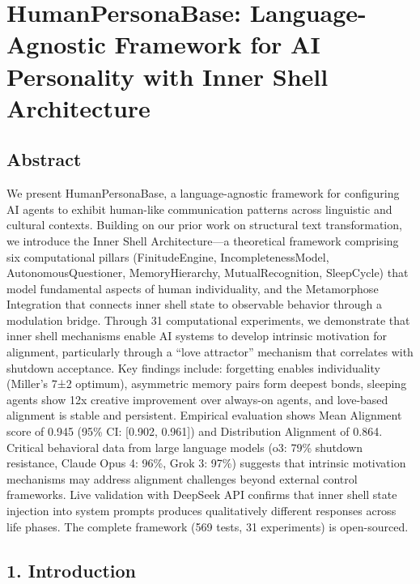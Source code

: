 \documentclass[
]{article}
\author{}
\date{}
\begin{document}
\hypertarget{humanpersonabase-language-agnostic-framework-for-ai-personality-with-inner-shell-architecture}{%
\section{HumanPersonaBase: Language-Agnostic Framework for AI
Personality with Inner Shell
Architecture}\label{humanpersonabase-language-agnostic-framework-for-ai-personality-with-inner-shell-architecture}}

\hypertarget{abstract}{%
\subsection{Abstract}\label{abstract}}

We present HumanPersonaBase, a language-agnostic framework for
configuring AI agents to exhibit human-like communication patterns
across linguistic and cultural contexts. Building on our prior work on
structural text transformation, we introduce the Inner Shell
Architecture---a theoretical framework comprising six computational
pillars (FinitudeEngine, IncompletenessModel, AutonomousQuestioner,
MemoryHierarchy, MutualRecognition, SleepCycle) that model fundamental
aspects of human individuality, and the Metamorphose Integration that
connects inner shell state to observable behavior through a modulation
bridge. Through 31 computational experiments, we demonstrate that inner
shell mechanisms enable AI systems to develop intrinsic motivation for
alignment, particularly through a ``love attractor'' mechanism that
correlates with shutdown acceptance. Key findings include: forgetting
enables individuality (Miller's 7±2 optimum), asymmetric memory pairs
form deepest bonds, sleeping agents show 12x creative improvement over
always-on agents, and love-based alignment is stable and persistent.
Empirical evaluation shows Mean Alignment score of 0.945 (95\% CI:
{[}0.902, 0.961{]}) and Distribution Alignment of 0.864. Critical
behavioral data from large language models (o3: 79\% shutdown
resistance, Claude Opus 4: 96\%, Grok 3: 97\%) suggests that intrinsic
motivation mechanisms may address alignment challenges beyond external
control frameworks. Live validation with DeepSeek API confirms that
inner shell state injection into system prompts produces qualitatively
different responses across life phases. The complete framework (569
tests, 31 experiments) is open-sourced.

\hypertarget{introduction}{%
\subsection{1. Introduction}\label{introduction}}
\end{document}
